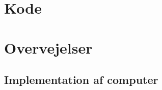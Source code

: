 \documentclass[a4paper,11pt]{article}
\title{\author{Emil Lagoni\\Erik Allin\\Peter Spliid}}
\begin{document}
\maketitle
\section*{Kode}


\section*{Overvejelser}
\subsection*{Implementation af computer}
\end{document}
